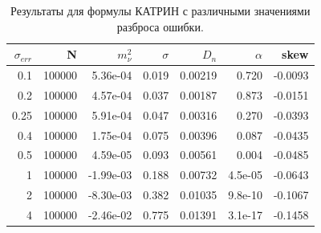 ﻿\documentclass[a4paper,14pt]{extarticle}
\begin{document}
	  \begin{table}
	    \caption{Результаты для формулы КАТРИН с различными значениями разброса ошибки.}
	    \begin{center}
		    \begin{tabular}{|r|r|r|r|r|r|r|}
			    \hline
			    $\sigma_{err}$ & N & $m^2_\nu$ & $\sigma$ & $D_n$ & $\alpha$ & skew \\
			    \hline
			    0.1 & 100000 & 5.36e-04 & 0.019 & 0.00219 & 0.720 & -0.0093 \\
			    \hline
			    0.2 & 100000 & 4.57e-04 & 0.037 & 0.00187 & 0.873 & -0.0151 \\
			    \hline
			    0.25 & 100000 & 5.91e-04 & 0.047 & 0.00316 & 0.270 & -0.0393 \\
			    \hline
			    0.4 & 100000 & 1.75e-04 & 0.075 & 0.00396 & 0.087 & -0.0435 \\
			    \hline
			    0.5 & 100000 & 4.59e-05 & 0.093 & 0.00561 & 0.004 & -0.0485 \\
			    \hline
			    1 & 100000 & -1.99e-03 & 0.188 & 0.00732 & 4.5e-05 & -0.0643 \\
			    \hline
			    2 & 100000 & -8.30e-03 & 0.382 & 0.01035 & 9.8e-10 & -0.1067 \\
			    \hline
			    4 & 100000 & -2.46e-02 & 0.775 & 0.01391 & 3.1e-17 & -0.1458 \\
			    \hline
		    \end{tabular}
	    \end{center}
    \end{table}
    
\end{document}
